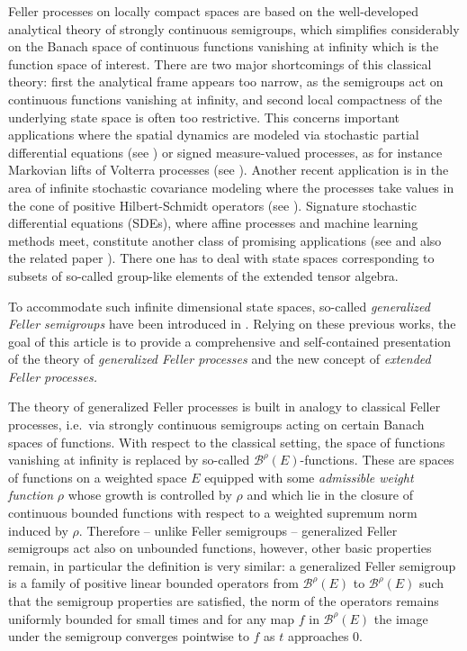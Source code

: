 \documentclass[a4paper,12pt]{article}
\theoremstyle{definition}
\theoremstyle{remark}
\numberwithin{equation}{section}
\numberwithin{theorem}{section}
\begin{document}
Feller processes on locally compact spaces are based on the well-developed analytical theory of strongly continuous semigroups, which simplifies considerably on the Banach space of continuous functions vanishing at infinity which is the function space of interest. There are two major shortcomings of this classical theory: first the analytical frame appears too narrow, as the semigroups act on continuous functions vanishing at infinity, and second local compactness of the underlying state space is often too restrictive. This concerns important applications where the spatial dynamics are modeled via stochastic partial differential equations (see \cite{RoS, DoT}) or signed measure-valued processes, as for instance Markovian lifts of Volterra processes (see \cite{CuT,cuchiero2019markovian, abi2019Markov, abi2019lifting}). Another recent application is in the area of  infinite stochastic covariance modeling  where the processes take values in the cone of positive
Hilbert-Schmidt operators (see \cite{cox2022affine, friesen2022stationary}). Signature stochastic differential equations (SDEs), where affine processes and  machine learning methods meet, constitute another class of promising applications (see  \cite{arribas2020sig,CSvT:23} and also the related paper \cite{friz2022unified}). There one has to deal with state spaces corresponding to subsets of so-called group-like elements of the extended tensor algebra.

To accommodate such infinite dimensional state spaces, so-called  \emph{generalized Feller semigroups} have been introduced in \cite{RoS, DoT}. Relying on these previous works, the goal of this article is to provide a comprehensive and self-contained presentation of the theory of \emph{generalized Feller processes}  and the new  concept of 
\emph{extended Feller processes.}

The theory of generalized Feller processes is built in analogy to classical Feller processes, i.e.~via strongly continuous semigroups acting on certain Banach spaces of functions. With respect to the classical setting, the space of functions vanishing at infinity is replaced by so-called $\mathcal{\mathscr{B}}^{\rho}(E)$-functions.
These are spaces of functions on a weighted space $E$  equipped with some \emph{admissible weight function}
$\rho$ whose growth is controlled by $\rho$ and which lie in the closure of continuous bounded functions with respect to  a weighted supremum norm induced by $\rho$. Therefore -- unlike Feller semigroups -- generalized Feller semigroups act also on unbounded functions, however, other basic properties remain, in particular the  definition is very similar: a
generalized Feller semigroup is a family of positive linear bounded operators from $\mathcal{\mathscr{B}}^{\rho}(E)$ to $\mathcal{\mathscr{B}}^{\rho}(E)$ such that the semigroup properties are satisfied, the norm of the operators remains uniformly bounded for small times and for any map $f$ in $\mathcal{\mathscr{B}}^{\rho}(E)$ the image under the semigroup converges pointwise to $f$ as $t$ approaches $0$.
\end{document}
